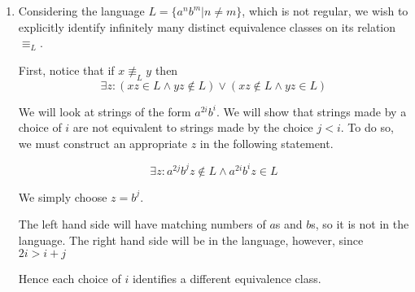 \documentclass{article}
\begin{document}
\begin{enumerate}
\begin{enumerate}
        \end{enumerate}

    \item
        Considering the language $L = \{a^n b^m | n \neq m\}$, which is not
        regular, we wish to explicitly identify infinitely many distinct
        equivalence classes on its relation $\equiv_L$.

        First, notice that if $x \not \equiv_L y$ then
        $$
        \exists z :
        (xz \in L \land yz \notin L) \lor (xz \notin L \land yz \in L)
        $$

        We will look at strings of the form $a^{2i} b^i$. We will show that
        strings made by a choice of $i$ are not equivalent to strings made by
        the choice $j < i$. To do so, we must construct an appropriate $z$ in
        the following statement.

        $$
        \exists z:
        a^{2j} b^{j} z \notin L \land a^{2i} b^i z \in L
        $$

        We simply choose $z = b^j$.

        The left hand side will have matching numbers of $a$s and $b$s, so it
        is not in the language. The right hand side will be in the language,
        however, since $2i > i + j$

        Hence each choice of $i$ identifies a different equivalence class.
\end{enumerate}
\end{document}

